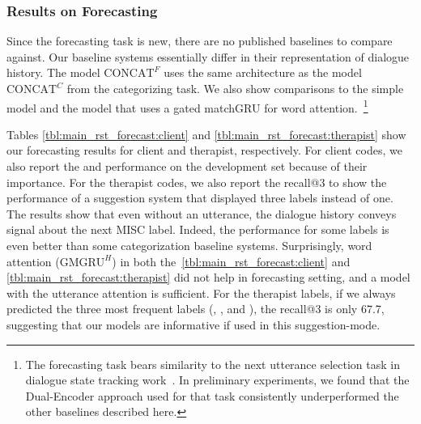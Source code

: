 \subsubsection{Results on Forecasting}
\label{sssec:snt:results-forecasting}
Since the forecasting task is new, there are no published baselines to
compare against. Our baseline systems essentially differ in their
representation of dialogue history. The model $\text{CONCAT}^{F}$ uses
the same architecture as the model $\text{CONCAT}^{C}$ from the
categorizing task. We also show comparisons to the simple \HGRU model
and the \GMGRUH model that uses a gated matchGRU for word
attention.~\footnote{The forecasting task bears similarity to the next
  utterance selection task in dialogue state tracking
  work~\citep{DSTC7}. In preliminary experiments, we found that the
  Dual-Encoder approach used for that task consistently underperformed
  the other baselines described here.}

Tables \ref{tbl:main_rst_forecast:client} and
\ref{tbl:main_rst_forecast:therapist} show our forecasting results
for client and therapist, respectively. For client codes, we also
report the \CHANGE and \SUSTAIN performance on the development set
because of their importance.  For the therapist codes, we also report
the recall@3 to show the performance of a suggestion system that
displayed three labels instead of one.
%
The results show that even without an utterance, the dialogue history
conveys signal about the next MISC label. Indeed, the performance for
some labels is even better than some categorization baseline
systems. Surprisingly, word attention ($\text{GMGRU}^{H}$) in both
the~\autoref{tbl:main_rst_forecast:client} and
\autoref{tbl:main_rst_forecast:therapist} did not help in forecasting
setting, and a model with the \self utterance attention is
sufficient. For the therapist labels, if we always predicted the three
most frequent labels (\FA, \GI, and \RES), the recall@3 is only 67.7,
suggesting that our models are informative if used in this
suggestion-mode.

